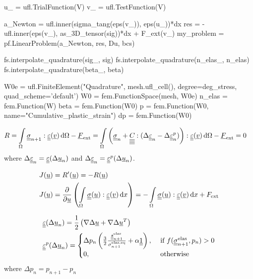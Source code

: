 \documentclass[12pt]{article}
\begin{document}
\begin{pythoncode}
    u_ = ufl.TrialFunction(V)
    v_ = ufl.TestFunction(V)

    a_Newton = ufl.inner(sigma_tang(eps(v_)), eps(u_))*dx
    res = -ufl.inner(eps(v_), as_3D_tensor(sig))*dx + F_ext(v_)
    my_problem = pf.LinearProblem(a_Newton, res, Du, bcs)
\end{pythoncode}

\begin{pythoncode}
    fs.interpolate_quadrature(sig_, sig)
    fs.interpolate_quadrature(n_elas_, n_elas)
    fs.interpolate_quadrature(beta_, beta)
\end{pythoncode}

\begin{pythoncode}
    W0e = ufl.FiniteElement("Quadrature", mesh.ufl_cell(), degree=deg_stress, quad_scheme='default')
    W0 = fem.FunctionSpace(mesh, W0e)
    n_elas = fem.Function(W)
    beta = fem.Function(W0)
    p = fem.Function(W0, name="Cumulative_plastic_strain")
    dp = fem.Function(W0)
\end{pythoncode}

\begin{align}
    & R = \int\limits_\Omega \underline{\underline{\sigma}}_{n+1} : \underline{\underline{\varepsilon}}(\underline{v}) \, \mathrm{d}\Omega - \underline{F}_\text{ext} = \int\limits_\Omega \left( \underline{\underline{\sigma}}_n + \underline{\underline{\underline{\underline{C_{}}}}} : (\Delta \underline{\underline{\varepsilon}}_{n} - \Delta \underline{\underline{\varepsilon}}_{n}^p) \right) : \underline{\underline{\varepsilon}}(\underline{v}) \, \mathrm{d}\Omega - \underline{F}_\text{ext} = 0
\end{align}
where $\Delta \underline{\underline{\varepsilon}}_{n} = \underline{\underline{\varepsilon}}(\Delta\underline{u}_n)$ and $\Delta \underline{\underline{\varepsilon}}_{n} = \underline{\underline{\varepsilon}}^p(\Delta\underline{u}_n)$.

\begin{align}
    & J(\underline{u}) = R^\prime(\underline{u}) = -R(\underline{u}) \\
    & J(\underline{u}) = \frac{\partial}{\partial\underline{u}}\left(\int\limits_\Omega\underline{\underline{\sigma}}(\underline{u}) : \underline{\underline{\varepsilon}}(\underline{v}) \, \mathrm{d} x 
    \right) = -\int\limits_\Omega\underline{\underline{\sigma}}(\underline{u}) : \underline{\underline{\varepsilon}}(\underline{v}) \, \mathrm{d} x + F_\text{ext}
\end{align}

\begin{align}
    & \underline{\underline{\varepsilon}}(\Delta\underline{u}_n) = \frac{1}{2} \left( \nabla\Delta\underline{u} + \nabla\Delta\underline{u}^T \right) \\
    & \underline{\underline{\varepsilon}}^p(\Delta\underline{u}_n) = 
        \begin{cases}
            \Delta p_n \left( \frac{3}{2}\frac{\underline{\underline{s}}_{n+1}^\text{elas}}{\sigma_{n+1}^\text{elas,eq}} + \alpha \underline{\underline{1}} \right), & \text{ if } f(\underline{\underline{\sigma}}_{n+1}^{\text{elas}}, p_n) > 0  \\
            0, & \text{ otherwise}
        \end{cases}
\end{align}
where $\Delta p_n = p_{n+1} - p_n$ 
\end{document}
